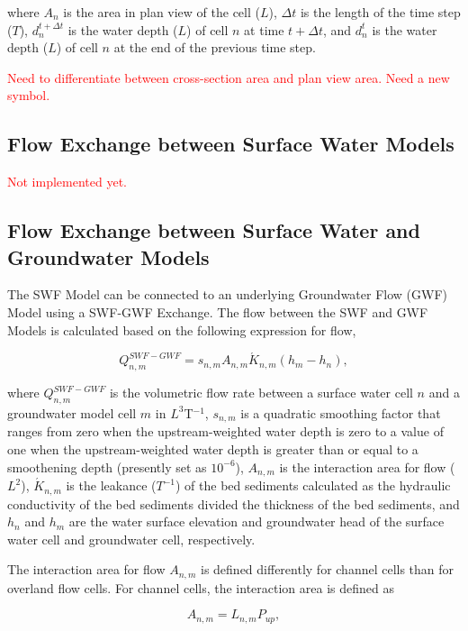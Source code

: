 \documentclass[fleqn]{article}
\begin{document}
\noindent where $A_n$ is the area in plan view of the cell ($L$), $\Delta t$ is the length of the time step ($T$), $d_n^{t + \Delta t}$ is the water depth ($L$) of cell $n$ at time $t + \Delta t$, and $d_n^t$ is the water depth ($L$) of cell $n$ at the end of the previous time step.

\textcolor{red}{Need to differentiate between cross-section area and plan view area.  Need a new symbol.}

\subsection{Flow Exchange between Surface Water Models}

\textcolor{red}{Not implemented yet.}


\subsection{Flow Exchange between Surface Water and Groundwater Models}

The SWF Model can be connected to an underlying Groundwater Flow (GWF) Model using a SWF-GWF Exchange.  The flow between the SWF and GWF Models is calculated based on the following expression for flow,

\begin{equation}
  Q_{n,m}^{SWF-GWF} = s_{n,m} A_{n,m} \acute{K}_{n,m} (h_m - h_n),
\end{equation}

\noindent where $Q_{n,m}^{SWF-GWF}$ is the volumetric flow rate between a surface water cell $n$ and a groundwater model cell $m$ in $L^{3}$T$^{-1}$, $s_{n,m}$ is a quadratic smoothing factor that ranges from zero when the upstream-weighted water depth is zero to a value of one when the upstream-weighted water depth is greater than or equal to a smoothening depth (presently set as $10^{-6}$), $A_{n,m}$ is the interaction area for flow ($L^2$), $\acute{K}_{n,m}$ is the leakance ($T^{-1}$) of the bed sediments calculated as the hydraulic conductivity of the bed sediments divided the thickness of the bed sediments, and $h_n$ and $h_m$ are the water surface elevation and groundwater head of the surface water cell and groundwater cell, respectively.

The interaction area for flow $A_{n,m}$ is defined differently for channel cells than for overland flow cells.  For channel cells, the interaction area is defined as

\begin{equation}
  A_{n,m} = L_{n,m} P_{up},
\end{equation}
\end{document}
